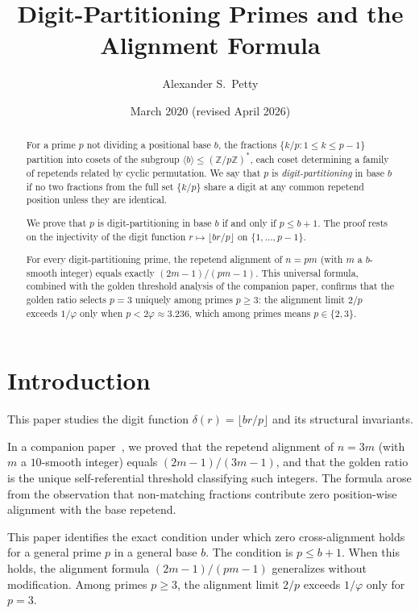 \documentclass[12pt]{amsart}
\title{Digit-Partitioning Primes and the Alignment Formula}
\author{Alexander S.\ Petty}
\date{March 2020 (revised April 2026)}
\theoremstyle{definition}
\theoremstyle{remark}
\begin{document}
\begin{abstract}
For a prime $p$ not dividing a positional base $b$, the fractions
$\{k/p : 1 \le k \le p{-}1\}$ partition into cosets of the subgroup
$\langle b \rangle \le (\mathbb{Z}/p\mathbb{Z})^{*}$, each coset
determining a family of repetends related by cyclic permutation. We
say that $p$ is \emph{digit-partitioning} in base $b$ if no two
fractions from the full set $\{k/p\}$ share a digit at any common
repetend position unless they are identical.

We prove that $p$ is digit-partitioning in base $b$ if and only if
$p \le b + 1$. The proof rests on the injectivity of the digit
function $r \mapsto \lfloor br/p \rfloor$ on $\{1, \ldots, p{-}1\}$.

For every digit-partitioning prime, the repetend alignment of
$n = pm$ (with $m$ a $b$-smooth integer) equals exactly
$(2m{-}1)/(pm{-}1)$. This universal formula, combined with the
golden threshold analysis of the companion paper, confirms that the
golden ratio selects $p = 3$ uniquely among primes
$p \ge 3$: the alignment limit $2/p$ exceeds
$1/\varphi$ only when $p < 2\varphi \approx 3.236$,
which among primes means $p \in \{2, 3\}$.
\end{abstract}
\maketitle

\section{Introduction}

This paper studies the digit function $\delta(r) = \lfloor br/p \rfloor$ and its structural invariants.

In a companion paper~\cite{paper1}, we proved that the repetend
alignment of $n = 3m$ (with $m$ a $10$-smooth integer) equals
$(2m{-}1)/(3m{-}1)$, and that the golden ratio is the unique
self-referential threshold classifying such integers. The formula
arose from the observation that non-matching fractions contribute
zero position-wise alignment with the base repetend.

This paper identifies the exact condition under which zero
cross-alignment holds for a general prime $p$ in a general base $b$.
The condition is $p \le b + 1$.
When this holds, the alignment formula $(2m{-}1)/(pm{-}1)$
generalizes without modification. Among primes $p \ge 3$,
the alignment limit $2/p$ exceeds $1/\varphi$ only for
$p = 3$.
\end{document}
